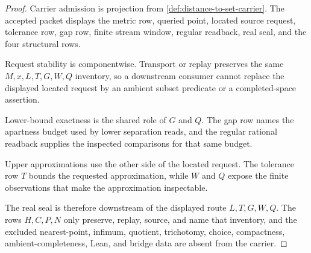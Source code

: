 \begin{proof}
Carrier admission is projection from \autoref{def:distance-to-set-carrier}. The accepted packet displays the metric row, queried point, located source request, tolerance row, gap row, finite stream window, regular readback, real seal, and the four structural rows.

Request stability is componentwise. Transport or replay preserves the same $M,x,L,T,G,W,Q$ inventory, so a downstream consumer cannot replace the displayed located request by an ambient subset predicate or a completed-space assertion.

Lower-bound exactness is the shared role of $G$ and $Q$. The gap row names the apartness budget used by lower separation reads, and the regular rational readback supplies the inspected comparisons for that same budget.

Upper approximations use the other side of the located request. The tolerance row $T$ bounds the requested approximation, while $W$ and $Q$ expose the finite observations that make the approximation inspectable.

The real seal is therefore downstream of the displayed route $L,T,G,W,Q$. The rows $H,C,P,N$ only preserve, replay, source, and name that inventory, and the excluded nearest-point, infimum, quotient, trichotomy, choice, compactness, ambient-completeness, Lean, and bridge data are absent from the carrier.
\end{proof}


